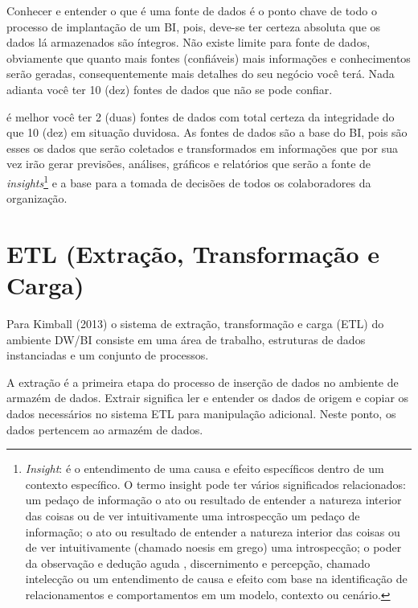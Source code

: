 Conhecer e entender o que \'{e} uma fonte de dados \'{e} o ponto chave de todo o processo de implanta\c{c}\~{a}o de um BI, pois, deve-se ter certeza absoluta que os dados l\'{a} armazenados s\~{a}o íntegros. N\~{a}o existe limite para fonte de dados, obviamente que quanto mais fontes (confi\'{a}veis) mais informa\c{c}ões e conhecimentos ser\~{a}o geradas, consequentemente mais detalhes do seu negócio você ter\'{a}. Nada adianta você ter 10 (dez) fontes de dados que n\~{a}o se pode confiar. 

\'{e} melhor você ter 2 (duas) fontes de dados com total certeza da integridade do que 10 (dez) em situa\c{c}\~{a}o duvidosa. As fontes de dados s\~{a}o a base do BI, pois s\~{a}o esses os dados que ser\~{a}o coletados e transformados em informa\c{c}ões que por sua vez ir\~{a}o gerar previsões, an\'{a}lises, gr\'{a}ficos e relatórios que ser\~{a}o a fonte de \textit{insights}\footnote{\textit{Insight}: \'{e} o entendimento de uma causa e efeito específicos dentro de um contexto específico. O termo insight pode ter v\'{a}rios significados relacionados: um peda\c{c}o de informa\c{c}\~{a}o o ato ou resultado de entender a natureza interior das coisas ou de ver intuitivamente uma introspec\c{c}\~{a}o um peda\c{c}o de informa\c{c}\~{a}o; o ato ou resultado de entender a natureza interior das coisas ou de ver intuitivamente (chamado noesis em grego) uma introspec\c{c}\~{a}o; o poder da observa\c{c}\~{a}o e dedu\c{c}\~{a}o aguda , discernimento e percep\c{c}\~{a}o, chamado intelec\c{c}\~{a}o ou um entendimento de causa e efeito com base na identifica\c{c}\~{a}o de relacionamentos e comportamentos em um modelo, contexto ou cen\'{a}rio.} e a base para a tomada de decisões de todos os colaboradores da organiza\c{c}\~{a}o.

\section{ETL (Extra\c{c}\~{a}o, Transforma\c{c}\~{a}o e Carga)}

Para Kimball (2013) o sistema de extra\c{c}\~{a}o, transforma\c{c}\~{a}o e carga (ETL) do ambiente DW/BI consiste em uma \'{a}rea de trabalho, estruturas de dados instanciadas e um conjunto de processos.

A extra\c{c}\~{a}o \'{e} a primeira etapa do processo de inser\c{c}\~{a}o de dados no ambiente de armaz\'{e}m de dados. Extrair significa ler e entender os dados de origem e copiar os dados necess\'{a}rios no sistema ETL para manipula\c{c}\~{a}o adicional. Neste ponto, os dados pertencem ao armaz\'{e}m de dados.

